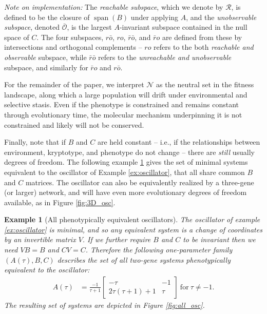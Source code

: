 \documentclass{article}
\newcommand{\ro}{{ro}}
\newcommand{\nro}{{\bar{r}o}}
\newcommand{\rno}{{r\bar{o}}}
\newcommand{\nrno}{{\bar{r}\bar{o}}}
\newcommand{\reachable}{\mathcal{R}}
\newcommand{\unobservable}{\bar{\mathcal{O}}}
\newcommand{\1}{\mathbbm{1}}
\newcommand{\Sys}{\mathcal{S}}
\newcommand{\allS}{\mathcal{N}}
\DeclareMathOperator{\spn}{span}
\newtheorem{example}{Example}
\begin{document}
\emph{Note on implementation:}
The \emph{reachable subspace},
which we denote by $\reachable$,
is defined to be the closure of $\spn(B)$ under applying $A$,
and the \emph{unobservable subspace}, 
denoted $\unobservable$, is the largest $A$-invariant subspace
contained in the null space of $C$.
The four subspaces, $\rno$, $\ro$, $\nrno$, and $\nro$
are defined from these by intersections and orthogonal complements --
$\ro$ refers to the both \emph{reachable and observable} subspace,
while $\nrno$ refers to the \emph{unreachable and unobservable} subspace,
and similarly for $\nro$ and $\rno$.


For the remainder of the paper, we interpret $\allS$ as the neutral set in the fitness landscape, 
along which a large population will drift under environmental and selective stasis. 
Even if the phenotype is constrained and remains constant through evolutionary time, 
the molecular mechanism underpinning it is not constrained and likely will not be conserved.

Finally, note that if $B$ and $C$ are held constant --
i.e., if the relationships between environment, kryptotype, and phenotype do not change --
there are \emph{still} usually degrees of freedom. 
The following example \ref{ex:all_osc} gives the set of minimal systems equivalent to the oscillator of Example \ref{ex:oscillator},
that all share common $B$ and $C$ matrices.
The oscillator can also be equivalently realized by a three-gene (or larger) network, and will have even more evolutionary degrees of freedom available, 
as in Figure \ref{fig:3D_osc}.

\begin{example}[All phenotypically equivalent oscillators] \label{ex:all_osc}
The oscillator of example \ref{ex:oscillator} is minimal, and so any equivalent system is a change of coordinates
by an invertible matrix $V$.
If we further require $B$ and $C$ to be invariant then we need $VB=B$ and $CV=C$.
Therefore
the following one-parameter family $(A(\tau), B, C)$ describes the set of all two-gene systems
phenotypically equivalent to the oscillator:
    \begin{align*}
      A(\tau) &= \frac{-1}{\tau+1} \begin{bmatrix} -\tau & -1 \\ 2 \tau(\tau + 1) + 1 &  \tau \end{bmatrix} \ \text{for} \ \tau \neq -1 .
    \end{align*}
The resulting set of systems are depicted in Figure \ref{fig:all_osc}.
\end{example}
\end{document}
